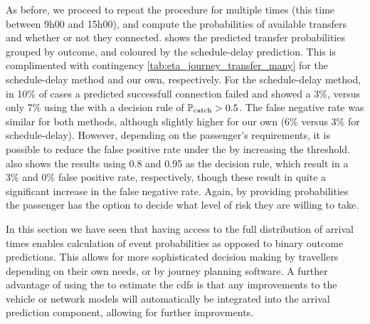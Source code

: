 As before, we proceed to repeat the procedure for multiple times (this time between  9h00 and 15h00), and compute the probabilities of available transfers and whether or not they connected.  shows the predicted transfer probabilities grouped by outcome, and coloured by the schedule-delay prediction. This is complimented with contingency \cref{tab:eta_journey_transfer_many} for the schedule-delay method and our own, respectively. For the schedule-delay method, in 10\% of cases a predicted successfull connection failed and showed a 3\%, versus only 7\% using the \pf{} with a decision rule of $\mathbb{P}_\text{catch} > 0.5$. The false negative rate was similar for both methods, although slightly higher for our own (6\% versus 3\% for schedule-delay). However, depending on the passenger's requirements, it is possible to reduce the false positive rate under the \pf{} by increasing the threshold.  also shows the results using 0.8 and 0.95 as the decision rule, which result in a 3\% and 0\% false positive rate, respectively, though these result in quite a significant increase in the false negative rate. Again, by providing probabilities the passenger has the option to decide what level of risk they are willing to take.


In this section we have seen that having access to the full distribution of arrival times enables calculation of event probabilities as opposed to binary outcome predictions. This allows for more sophisticated decision making by travellers depending on their own needs, or by journey planning software. A further advantage of using the \pf{} to estimate the \glspl{cdf} is  that any improvements to the vehicle or network models will automatically be integrated into the arrival prediction component, allowing for further improvments.
